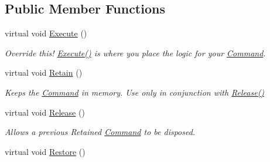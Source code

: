 \subsection*{Public Member Functions}
\begin{DoxyCompactItemize}
\item 
\hypertarget{classstrange_1_1extensions_1_1command_1_1impl_1_1_command_a4a1155270428842c342482c6885b2652}{virtual void \hyperlink{classstrange_1_1extensions_1_1command_1_1impl_1_1_command_a4a1155270428842c342482c6885b2652}{Execute} ()}\label{classstrange_1_1extensions_1_1command_1_1impl_1_1_command_a4a1155270428842c342482c6885b2652}

\begin{DoxyCompactList}\small\item\em Override this! {\ttfamily \hyperlink{classstrange_1_1extensions_1_1command_1_1impl_1_1_command_a4a1155270428842c342482c6885b2652}{Execute()}} is where you place the logic for your \hyperlink{classstrange_1_1extensions_1_1command_1_1impl_1_1_command}{Command}. \end{DoxyCompactList}\item 
\hypertarget{classstrange_1_1extensions_1_1command_1_1impl_1_1_command_ae1fd4be633a9619861930197b51ad6ea}{virtual void \hyperlink{classstrange_1_1extensions_1_1command_1_1impl_1_1_command_ae1fd4be633a9619861930197b51ad6ea}{Retain} ()}\label{classstrange_1_1extensions_1_1command_1_1impl_1_1_command_ae1fd4be633a9619861930197b51ad6ea}

\begin{DoxyCompactList}\small\item\em Keeps the \hyperlink{classstrange_1_1extensions_1_1command_1_1impl_1_1_command}{Command} in memory. Use only in conjunction with {\ttfamily \hyperlink{classstrange_1_1extensions_1_1command_1_1impl_1_1_command_a41896e346d95419f179c8af2ccb5696d}{Release()}} \end{DoxyCompactList}\item 
\hypertarget{classstrange_1_1extensions_1_1command_1_1impl_1_1_command_a41896e346d95419f179c8af2ccb5696d}{virtual void \hyperlink{classstrange_1_1extensions_1_1command_1_1impl_1_1_command_a41896e346d95419f179c8af2ccb5696d}{Release} ()}\label{classstrange_1_1extensions_1_1command_1_1impl_1_1_command_a41896e346d95419f179c8af2ccb5696d}

\begin{DoxyCompactList}\small\item\em Allows a previous Retained \hyperlink{classstrange_1_1extensions_1_1command_1_1impl_1_1_command}{Command} to be disposed. \end{DoxyCompactList}\item 
\hypertarget{classstrange_1_1extensions_1_1command_1_1impl_1_1_command_a150a8abf7136daecc1a991836feda470}{virtual void \hyperlink{classstrange_1_1extensions_1_1command_1_1impl_1_1_command_a150a8abf7136daecc1a991836feda470}{Restore} ()}\label{classstrange_1_1extensions_1_1command_1_1impl_1_1_command_a150a8abf7136daecc1a991836feda470}


\end{DoxyCompactItemize}

